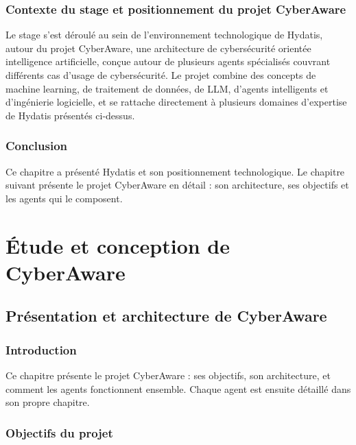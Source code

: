 \documentclass[12pt,a4paper]{report}
\begin{document}
\section{Contexte du stage et positionnement du projet CyberAware}

Le stage s'est déroulé au sein de l'environnement technologique de Hydatis, autour du projet CyberAware, une architecture de cybersécurité orientée intelligence artificielle, conçue autour de plusieurs agents spécialisés couvrant différents cas d'usage de cybersécurité. Le projet combine des concepts de machine learning, de traitement de données, de LLM, d'agents intelligents et d'ingénierie logicielle, et se rattache directement à plusieurs domaines d'expertise de Hydatis présentés ci-dessus.

\section{Conclusion}

Ce chapitre a présenté Hydatis et son positionnement technologique. Le chapitre suivant présente le projet CyberAware en détail : son architecture, ses objectifs et les agents qui le composent.

\part{Étude et conception de CyberAware}

\chapter{Présentation et architecture de CyberAware}

\section{Introduction}

Ce chapitre présente le projet CyberAware : ses objectifs, son architecture, et comment les agents fonctionnent ensemble. Chaque agent est ensuite détaillé dans son propre chapitre.

\section{Objectifs du projet}
\end{document}
